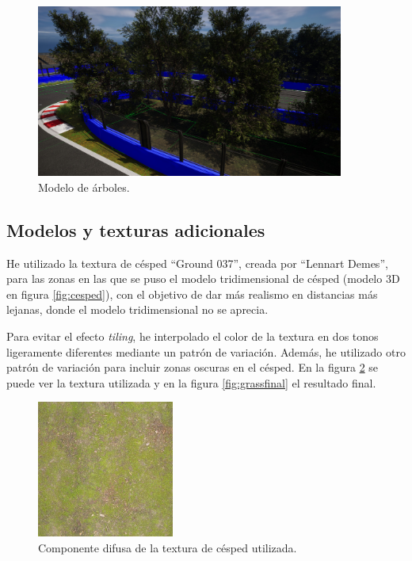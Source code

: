 \begin{figure}[H]
    \centering
    \includegraphics[width=0.9\textwidth]{imagenes/converted/arboles.jpg}
    \caption{Modelo de árboles.}
    \label{fig:arboles}
\end{figure}

\subsection{Modelos y texturas adicionales}

He utilizado la textura de césped ``Ground 037''\cite{grasstexture}, creada por ``Lennart Demes'', para las zonas en las que se puso el modelo tridimensional de césped (modelo 3D en figura \ref{fig:cesped}), con el objetivo de dar más realismo en distancias más lejanas, donde el modelo tridimensional no se aprecia. 

\bigskip

Para evitar el efecto \textit{tiling}, he interpolado el color de la textura en dos tonos ligeramente diferentes mediante un patrón de variación. Además, he utilizado otro patrón de variación para incluir zonas oscuras en el césped. En la figura \ref{fig:grasstexture} se puede ver la textura utilizada y en la figura \ref{fig:grassfinal} el resultado final.

\begin{figure}[H]
    \centering
    \includegraphics[width=0.4\textwidth]{imagenes/converted/Ground037_1K_Color.jpg}
    \caption{Componente difusa de la textura de césped utilizada.}
    \label{fig:grasstexture}
\end{figure}

